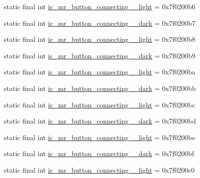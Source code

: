 \begin{CompactItemize}
\item 
static final int \hyperlink{classandroid_1_1support_1_1graphics_1_1drawable_1_1animated_1_1_r_1_1drawable_075cee48474d23bfb9bf0ac4fe43495b}{ic\_\-mr\_\-button\_\-connecting\_\_\-light} = 0x7f0200b6
\item 
static final int \hyperlink{classandroid_1_1support_1_1graphics_1_1drawable_1_1animated_1_1_r_1_1drawable_91a2f2f988c07c254852ab4f257ceaca}{ic\_\-mr\_\-button\_\-connecting\_\_\-dark} = 0x7f0200b7
\item 
static final int \hyperlink{classandroid_1_1support_1_1graphics_1_1drawable_1_1animated_1_1_r_1_1drawable_1f4e07a4eadc501c860b616e29a84833}{ic\_\-mr\_\-button\_\-connecting\_\_\-light} = 0x7f0200b8
\item 
static final int \hyperlink{classandroid_1_1support_1_1graphics_1_1drawable_1_1animated_1_1_r_1_1drawable_75eb8fc9e28e1dc193aa633df48e1212}{ic\_\-mr\_\-button\_\-connecting\_\_\-dark} = 0x7f0200b9
\item 
static final int \hyperlink{classandroid_1_1support_1_1graphics_1_1drawable_1_1animated_1_1_r_1_1drawable_42e7c2a4ca2acc5f9c1c1136c98e39be}{ic\_\-mr\_\-button\_\-connecting\_\_\-light} = 0x7f0200ba
\item 
static final int \hyperlink{classandroid_1_1support_1_1graphics_1_1drawable_1_1animated_1_1_r_1_1drawable_48417ff764da12c042fffc5aaabc6986}{ic\_\-mr\_\-button\_\-connecting\_\_\-dark} = 0x7f0200bb
\item 
static final int \hyperlink{classandroid_1_1support_1_1graphics_1_1drawable_1_1animated_1_1_r_1_1drawable_567d9ade579aa57b40d86b747eb67c5d}{ic\_\-mr\_\-button\_\-connecting\_\_\-light} = 0x7f0200bc
\item 
static final int \hyperlink{classandroid_1_1support_1_1graphics_1_1drawable_1_1animated_1_1_r_1_1drawable_14c3bea4d29e6fd36165f5b80ed15b59}{ic\_\-mr\_\-button\_\-connecting\_\_\-dark} = 0x7f0200bd
\item 
static final int \hyperlink{classandroid_1_1support_1_1graphics_1_1drawable_1_1animated_1_1_r_1_1drawable_3ef3c3e294abb2358e51f1456a0d18d5}{ic\_\-mr\_\-button\_\-connecting\_\_\-light} = 0x7f0200be
\item 
static final int \hyperlink{classandroid_1_1support_1_1graphics_1_1drawable_1_1animated_1_1_r_1_1drawable_c4dfaed0eeaa9dd14e2a2bec5b4f2052}{ic\_\-mr\_\-button\_\-connecting\_\_\-dark} = 0x7f0200bf
\item 
static final int \hyperlink{classandroid_1_1support_1_1graphics_1_1drawable_1_1animated_1_1_r_1_1drawable_614857970a492f17d9f7dbff407b6802}{ic\_\-mr\_\-button\_\-connecting\_\_\-light} = 0x7f0200c0

\end{CompactItemize}
